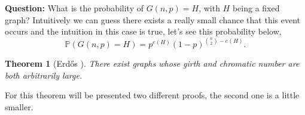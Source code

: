 \documentclass[12pt,twoside,a4paper]{book}
\numberwithin{equation}{section}
\newtheorem{theorem}             {Theorem}[section]
\theoremstyle{remark}
\begin{document}

{\bf Question:} What is the probability of $G(n,p) = H$, with $H$ being a fixed graph?
Intuitively we can guess there exists a really small chance that this event occurs and the intuition in this case is true, let's see this probability below,
$$\mathbb{P}(G(n,p)=H) = p^{e(H)}(1-p)^{\binom{n}{2}-e(H)}.$$

\begin{theorem}[{Erd\H{o}s \cite{Er59}}] There exist graphs whose girth and chromatic number are both arbitrarily large.
\end{theorem}

For this theorem will be presented two different proofs, the second one is a little smaller.
\end{document}
